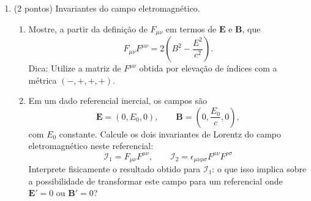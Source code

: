 \begin{enumerate}
    \item (2 pontos) Invariantes do campo eletromagnético.

          \begin{enumerate}
              \item Mostre, a partir da definição de $F_{\mu\nu}$ em termos de $\mathbf
                        E$ e $\mathbf B$, que
                    $$
                        F_{\mu\nu}F^{\mu\nu}
                        =
                        2\left(
                        B^2-\frac{E^2}{c^2}
                        \right).
                    $$
                    Dica: Utilize a matriz de $F^{\mu\nu}$ obtida por elevação de
                    índices com a métrica $(-,+,+,+)$.

              \item Em um dado referencial inercial, os campos são
                    $$
                        \mathbf E=(0,E_0,0),
                        \qquad
                        \mathbf B=\left(0,\frac{E_0}{c},0\right),
                    $$
                    com $E_0$ constante. Calcule os dois invariantes de Lorentz do
                    campo eletromagnético neste referencial:
                    $$
                        \mathcal{I}_1 = F_{\mu\nu}F^{\mu\nu}, \qquad
                        \mathcal{I}_2 = \epsilon_{\mu\nu\rho\sigma} F^{\mu\nu} F^{\rho\sigma}
                    $$
                    Interprete fisicamente o resultado obtido para $\mathcal{I}_1$: o
                    que isso implica sobre a possibilidade de transformar este campo
                    para um referencial onde $\mathbf E' = 0$ ou $\mathbf B' = 0$?
          \end{enumerate}

\end{enumerate}


